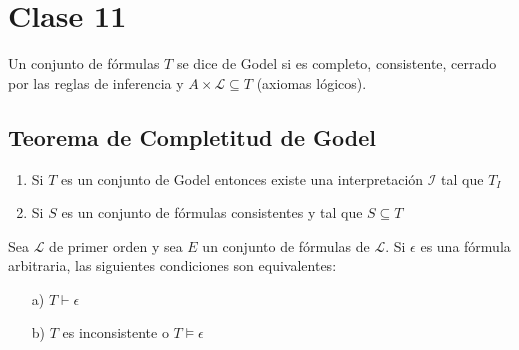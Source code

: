 \section{Clase 11}

Un conjunto de f\'ormulas $T$ se dice de Godel si es completo, consistente, cerrado por las reglas de inferencia y $A \times \mathcal{L} \subseteq T$ (axiomas l\'ogicos).

\subsection{Teorema de Completitud de Godel}

\begin{enumerate}
	\item Si $T$ es un conjunto de Godel entonces existe una interpretaci\'on $\mathcal{I}$ tal que $T_{I}$
	\item Si $S$ es un conjunto de f\'ormulas consistentes y tal que $S \subseteq T$
\end{enumerate}

\begin{colorario}
Sea $\mathcal{L}$ de primer orden y sea $E$ un conjunto de f\'ormulas de $\mathcal{L}$. Si $\epsilon$ es una f\'ormula arbitraria, las siguientes condiciones son equivalentes:

\begin{enumerate}
	\item[a)] $T \vdash \epsilon$
	\item[b)] $T$ es inconsistente o $T \models \epsilon$
\end{enumerate}
\end{colorario}

